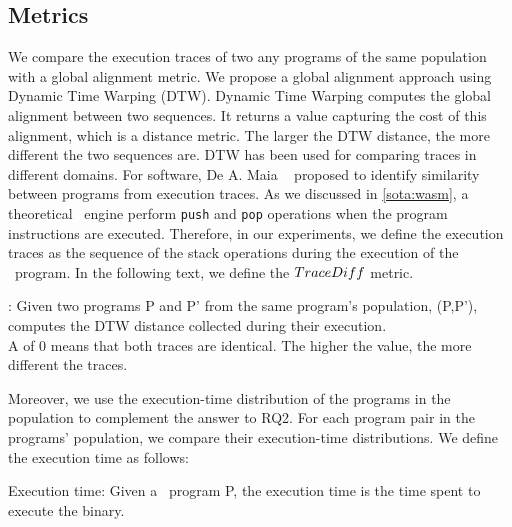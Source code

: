 \subsection*{Metrics}
\label{rq2:metrics}

We compare the execution traces of two any programs of the same population with a global alignment metric. We propose a global alignment approach using Dynamic Time Warping (DTW).
Dynamic Time Warping \cite{NEEDLEMAN1970443} computes the global alignment between two sequences. It returns a value capturing the cost of this alignment, which is a distance metric. The larger the DTW distance, the more different the two sequences are.
DTW has been used for comparing traces in different domains. For software, De A. Maia \etal\ \cite{Maia08usinga} proposed to identify similarity between programs from execution traces.
As we discussed in \autoref{sota:wasm}, a theoretical \wasm\ engine perform \texttt{push} and \texttt{pop} operations when the program instructions are executed. Therefore, in our experiments, we define the execution traces as the sequence of the stack operations during the execution of the \wasm\ program. 
In the following text, we define the $TraceDiff$ metric. 
 

\begin{metric}{\DTW{}:}
\label{metric:stack}
\normalfont 
	Given two programs P and P' from the same program's population, \DTW{}(P,P'), computes the DTW distance collected during their execution. \\
	A \DTW{} of $0$ means that both traces are identical.
	The higher the value, the more different the traces. 
\end{metric}



Moreover, we use the execution-time distribution of the programs in the population to complement the answer to RQ2. For each program pair in the programs' population, we compare their execution-time distributions. We define the execution time as follows:

\begin{metric}{Execution time:}\label{metric:time}
    \normalfont 
	Given a \wasm\ program P, the execution time is the time spent to execute the binary.
\end{metric}



